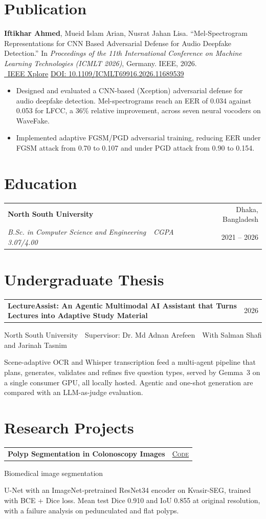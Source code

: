 \documentclass[a4paper,10pt]{article}
\makeatletter
\newcommand{\entry}[4]{%
  \begin{tabularx}{\linewidth}{@{}X r@{}}
    \textbf{#1} & #2 \\
    \textit{\small #3} & {\small\color{muted}#4} \\
  \end{tabularx}\par\vspace{1pt}}
\newcommand{\project}[4]{%
  \needspace{5\baselineskip}%
  \begin{tabularx}{\linewidth}{@{}X r@{}}
    \textbf{#1} & {\footnotesize\color{accent}\textsc{#2}} \\
  \end{tabularx}\par
  {\small\color{muted}#3}\par\vspace{1pt}
  {\small #4}\par\vspace{4pt}}
\newenvironment{tight}{\begin{itemize}[leftmargin=1.1em, itemsep=0pt, parsep=0pt, topsep=2pt, partopsep=0pt, label={\textbullet}]\small}{\end{itemize}}
\makeatother
\begin{document}
\section{Publication}
\small
\textbf{Iftikhar Ahmed}, Mueid Islam Arian, Nusrat Jahan Lisa.
``Mel-Spectrogram Representations for CNN Based Adversarial Defense for Audio Deepfake Detection.''
In \textit{Proceedings of the 11th International Conference on Machine Learning Technologies (ICMLT 2026)}, Germany. IEEE, 2026.\\[2pt]
\href{https://ieeexplore.ieee.org/document/11689539}{\faExternalLink*\ IEEE Xplore} \quad
\href{https://doi.org/10.1109/ICMLT69916.2026.11689539}{DOI: 10.1109/ICMLT69916.2026.11689539}
\begin{tight}
  \item Designed and evaluated a CNN-based (Xception) adversarial defense for audio deepfake detection. Mel-spectrograms
        reach an EER of 0.034 against 0.053 for LFCC, a 36\% relative improvement, across seven neural vocoders on WaveFake.
  \item Implemented adaptive FGSM/PGD adversarial training, reducing EER under FGSM attack from 0.70 to 0.107 and
        under PGD attack from 0.90 to 0.154.
\end{tight}
\normalsize

\section{Education}
\entry{North South University}{Dhaka, Bangladesh}
{B.Sc. in Computer Science and Engineering \,\textperiodcentered\, CGPA 3.07/4.00}{2021 -- 2026}

\section{Undergraduate Thesis}
\project{LectureAssist: An Agentic Multimodal AI Assistant that Turns Lectures into Adaptive Study Material}{2026}
{North South University \,\textperiodcentered\, Supervisor: Dr. Md Adnan Arefeen \,\textperiodcentered\, With Salman Shafi and Jarinah Tasnim}
{Scene-adaptive OCR and Whisper transcription feed a multi-agent pipeline that plans, generates, validates and
refines five question types, served by Gemma~3 on a single consumer GPU, all locally hosted. Agentic and one-shot
generation are compared with an LLM-as-judge evaluation.}

\section{Research Projects}
\project{Polyp Segmentation in Colonoscopy Images}{\href{https://github.com/NinjaIfti/Bio-Segmentation}{Code}}
{Biomedical image segmentation}
{U-Net with an ImageNet-pretrained ResNet34 encoder on Kvasir-SEG, trained with BCE + Dice loss. Mean test Dice
0.910 and IoU 0.855 at original resolution, with a failure analysis on pedunculated and flat polyps.}
\end{document}
